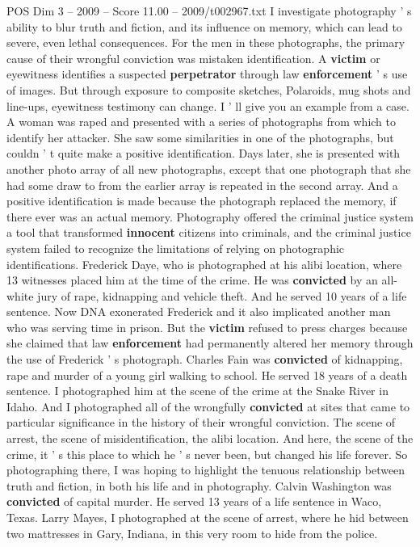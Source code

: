 \begin{textsample}{POS Dim 3 – 2009 – Score 11.00 – 2009/t002967.txt}
I investigate photography ' s ability to blur truth and fiction, and its influence on memory, which can lead to severe, even lethal consequences.
For the men in these photographs, the primary cause of their wrongful conviction was mistaken identification.
A \textbf{victim} or eyewitness identifies a suspected \textbf{perpetrator} through law \textbf{enforcement} ' s use of images.
But through exposure to composite sketches, Polaroids, mug shots and line-ups, eyewitness testimony can change.
I ' ll give you an example from a case.
A woman was raped and presented with a series of photographs from which to identify her attacker.
She saw some similarities in one of the photographs, but couldn ' t quite make a positive identification.
Days later, she is presented with another photo array of all new photographs, except that one photograph that she had some draw to from the earlier array is repeated in the second array.
And a positive identification is made because the photograph replaced the memory, if there ever was an actual memory.
Photography offered the criminal justice system a tool that transformed \textbf{innocent} citizens into criminals, and the criminal justice system failed to recognize the limitations of relying on photographic identifications.
Frederick Daye, who is photographed at his alibi location, where 13 witnesses placed him at the time of the crime.
He was \textbf{convicted} by an all-white jury of rape, kidnapping and vehicle theft.
And he served 10 years of a life sentence.
Now DNA exonerated Frederick and it also implicated another man who was serving time in prison.
But the \textbf{victim} refused to press charges because she claimed that law \textbf{enforcement} had permanently altered her memory through the use of Frederick ' s photograph.
Charles Fain was \textbf{convicted} of kidnapping, rape and murder of a young girl walking to school.
He served 18 years of a death sentence.
I photographed him at the scene of the crime at the Snake River in Idaho.
And I photographed all of the wrongfully \textbf{convicted} at sites that came to particular significance in the history of their wrongful conviction.
The scene of arrest, the scene of misidentification, the alibi location.
And here, the scene of the crime, it ' s this place to which he ' s never been, but changed his life forever.
So photographing there, I was hoping to highlight the tenuous relationship between truth and fiction, in both his life and in photography.
Calvin Washington was \textbf{convicted} of capital murder.
He served 13 years of a life sentence in Waco, Texas.
Larry Mayes, I photographed at the scene of arrest, where he hid between two mattresses in Gary, Indiana, in this very room to hide from the police.

\end{textsample}
